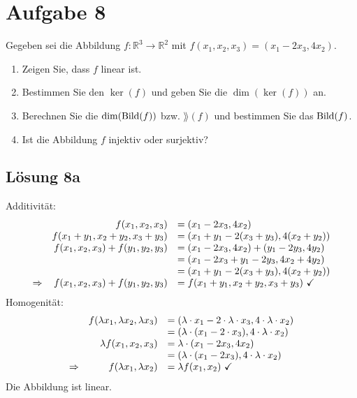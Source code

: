 \documentclass[main.tex]{subfiles}
\begin{document}
\section{Aufgabe 8}
Gegeben sei die Abbildung $f : \mathbb{R}^3 \to \mathbb{R}^2$ mit $f(x_1, x_2, x_3) = (x_1 - 2x_3, 4x_2)$.

\begin{enumerate}
    \item Zeigen Sie, dass $f$ linear ist.
    \item Bestimmen Sie den $\ker(f)$ und geben Sie die $\dim (\ker (f))$ an.
    \item Berechnen Sie die $\dim(\operatorname{Bild}(f))$ bzw. $\rang(f)$ und bestimmen Sie das $\operatorname{Bild}(f)$.
    \item Ist die Abbildung $f$ injektiv oder surjektiv?
\end{enumerate}

\subsection{Lösung 8a}

Additivität:
\begin{equation*}
    \begin{array}{ r r l }
    & f(x_1, x_2, x_3) & = (x_1 - 2x_3, 4x_2)\\
    & f(x_1 + y_1, x_2 + y_2, x_3 + y_3)  & = (x_1 + y_1 - 2(x_3 + y_3), 4(x_2 + y_2)) \\
    & f(x_1, x_2, x_3) + f(y_1, y_2, y_3) & = (x_1 - 2x_3, 4x_2) + (y_1 - 2y_3, 4y_2) \\
    & & = (x_1 - 2x_3 + y_1 - 2y_3, 4x_2 + 4y_2) \\
    & & = (x_1 + y_1 - 2(x_3 + y_3 ), 4(x_2 + y_2)) \\
    \Rightarrow  & f(x_1, x_2, x_3) + f(y_1, y_2, y_3) & = f(x_1 + y_1, x_2 + y_2, x_3 + y_3) \ \checkmark
    \end{array}
\end{equation*}
Homogenität:
\begin{equation*}
    \begin{array}{ r r l }
    & f(\lambda x_1, \lambda x_2, \lambda x_3) & = (\lambda \cdot x_1 - 2\cdot \lambda \cdot x_3, 4 \cdot \lambda \cdot x_2)\\
    & & = (\lambda \cdot (x_1 - 2 \cdot x_3), 4 \cdot \lambda \cdot x_2)\\
    & \lambda f(x_1, x_2, x_3) & = \lambda \cdot (x_1 - 2x_3, 4x_2)\\
    & & = (\lambda \cdot (x_1 - 2x_3), 4 \cdot \lambda \cdot x_2)\\
    \Rightarrow  & f( \lambda x_{1} ,\lambda x_{2}) & =\lambda f( x_{1} ,x_{2}) \ \checkmark
    \end{array}
\end{equation*}
Die Abbildung ist linear.
\end{document}
